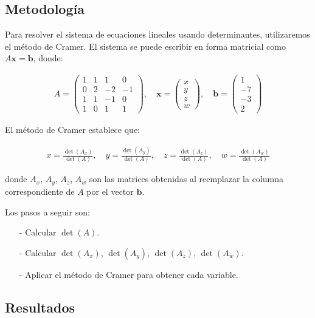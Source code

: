 \documentclass{article}
\begin{document}
\subsection{Metodología}

Para resolver el sistema de ecuaciones lineales usando determinantes, utilizaremos el método de Cramer. El sistema se puede escribir en forma matricial como $A\mathbf{x} = \mathbf{b}$, donde:

\begin{align*}
    A = \begin{pmatrix}
    1 & 1 & 1 & 0 \\
    0 & 2 & -2 & -1 \\
    1 & 1 & -1 & 0 \\
    1 & 0 & 1 & 1
    \end{pmatrix}, \quad \mathbf{x} = \begin{pmatrix} x \\ y \\ z \\ w \end{pmatrix}, \quad \mathbf{b} = \begin{pmatrix} 1 \\ -7 \\ -3 \\ 2 \end{pmatrix}
\end{align*}

El método de Cramer establece que:

\begin{align*}
    x = \frac{\det(A_x)}{\det(A)}, \quad y = \frac{\det(A_y)}{\det(A)}, \quad z = \frac{\det(A_z)}{\det(A)}, \quad w = \frac{\det(A_w)}{\det(A)}    
\end{align*}

donde $A_x$, $A_y$, $A_z$, $A_w$ son las matrices obtenidas al reemplazar la columna correspondiente de $A$ por el vector $\mathbf{b}$.

Los pasos a seguir son:
\begin{enumerate}
    \item[-] Calcular $\det(A)$.
    \item[-] Calcular $\det(A_x)$, $\det(A_y)$, $\det(A_z)$, $\det(A_w)$.
    \item[-] Aplicar el método de Cramer para obtener cada variable.
\end{enumerate}

\subsection{Resultados}
\setcounter{equation}{0}
\end{document}
